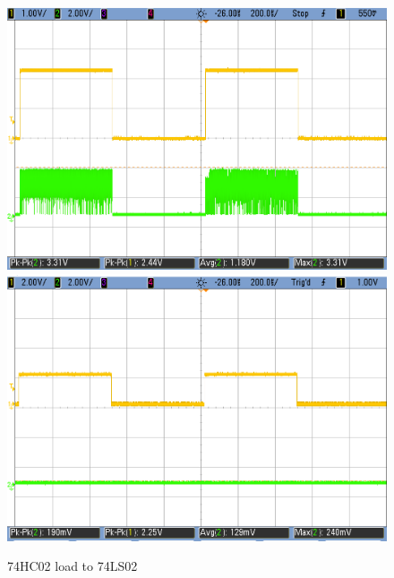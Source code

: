 \begin{figure}[h!]
	   \includegraphics[scale=0.2]{HC-LS-2p3V.png}\hspace{1cm}
        \includegraphics[scale=0.2]{HC-LS-2V.png}\hspace{1cm}
        \caption{\color{cyan}74HC02 load to 74LS02}
        \label{fig:ej2exhctols}
    \end{figure}
    
